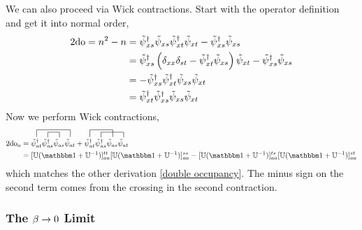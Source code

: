 We can also proceed via Wick contractions.
Start with the operator definition and get it into normal order,
\begin{align}
	2\textrm{do} = n^2 - n
	&=
	\tilde{\psi}{}^{\dagger}_{xs}\tilde{\psi}_{xs}
	\tilde{\psi}{}^{\dagger}_{xt}\tilde{\psi}_{xt}
	-
	\tilde{\psi}{}^{\dagger}_{xs}\tilde{\psi}_{xs}
	\nonumber\\
	&=
	\tilde{\psi}{}^{\dagger}_{xs}
	\left( \delta_{xx}\delta_{st} - \tilde{\psi}{}^{\dagger}_{xt}\tilde{\psi}_{xs} \right)
	\tilde{\psi}_{xt}
	-
	\tilde{\psi}{}^{\dagger}_{xs}\tilde{\psi}_{xs}
	\nonumber\\
	&=
	-\tilde{\psi}{}^{\dagger}_{xs}\tilde{\psi}{}^{\dagger}_{xt}\tilde{\psi}_{xs}\tilde{\psi}_{xt}
	\nonumber\\
	&=
	\tilde{\psi}{}^{\dagger}_{xt}\tilde{\psi}{}^{\dagger}_{xs}\tilde{\psi}_{xs}\tilde{\psi}_{xt}
\end{align}
Now we perform Wick contractions,
\begin{align}
	2\doubleOccupancy_a &= 
	\contraction[1em]{}{\tilde{\psi}\adjoint_{at}}{\tilde{\psi}\adjoint_{as}\tilde{\psi}_{as}}{\tilde{\psi}_{at}}
	\contraction[0.75em]{\tilde{\psi}\adjoint_{at}}{\tilde{\psi}\adjoint_{as}}{}{\tilde{\psi}_{as}}
	\tilde{\psi}\adjoint_{at}\tilde{\psi}\adjoint_{as}\tilde{\psi}_{as}\tilde{\psi}_{at}
	+
	\contraction[1em]{}{\tilde{\psi}\adjoint_{at}}{\tilde{\psi}\adjoint_{as}}{\tilde{\psi}_{as}}
	\contraction[0.75em]{\tilde{\psi}\adjoint_{at}}{\tilde{\psi}\adjoint_{as}}{\tilde{\psi}_{as}}{\tilde{\psi}_{at}}
	\tilde{\psi}\adjoint_{at}\tilde{\psi}\adjoint_{as}\tilde{\psi}_{as}\tilde{\psi}_{at}
	\nonumber\\
	&=
	[ \UU (\one+\UU\inverse) ]^{tt}_{aa}
	[ \UU (\one+\UU\inverse) ]^{ss}_{aa} 
	-
	[ \UU (\one+\UU\inverse) ]^{ts}_{aa}
	[ \UU (\one+\UU\inverse) ]^{st}_{aa} 
\end{align}
which matches the other derivation \eqref{double occupancy}.
The minus sign on the second term comes from the crossing in the second contraction.

\subsubsection{The $\beta\rightarrow0$ Limit}

